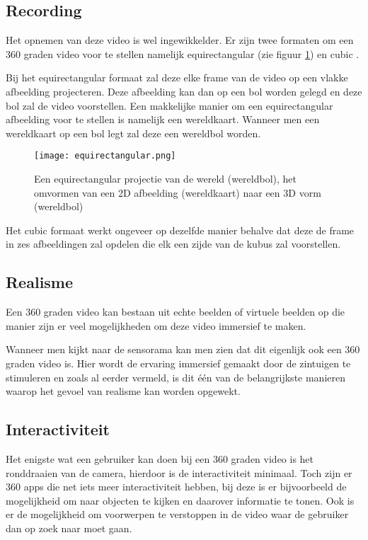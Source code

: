\subsection{Recording}
Het opnemen van deze video is wel ingewikkelder. Er zijn twee formaten om een 360 graden video voor te stellen namelijk equirectangular (zie figuur \ref{fig:equirectangularprojection}) en cubic \autocite{Lee2010}. 

Bij het equirectangular formaat zal deze elke frame van de video op een vlakke afbeelding projecteren. Deze afbeelding kan dan op een bol worden gelegd en deze bol zal de video voorstellen. Een makkelijke manier om een equirectangular afbeelding voor te stellen is namelijk een wereldkaart. Wanneer men een wereldkaart op een bol legt zal deze een wereldbol worden.
 
\begin{figure}
    \texttt{[image: equirectangular.png]}
    \caption{Een equirectangular projectie van de wereld (wereldbol), het omvormen van een 2D afbeelding (wereldkaart) naar een 3D vorm (wereldbol) \autocite{Brown2017}}
    \label{fig:equirectangularprojection}
\end{figure}

Het cubic formaat werkt ongeveer op dezelfde manier behalve dat deze de frame in zes afbeeldingen zal opdelen die elk een zijde van de kubus zal voorstellen.

\subsection{Realisme}
Een 360 graden video kan bestaan uit echte beelden of virtuele beelden op die manier zijn er veel mogelijkheden om deze video immersief te maken. 

Wanneer men kijkt naar de sensorama kan men zien dat dit eigenlijk ook een 360 graden video is. Hier wordt de ervaring immersief gemaakt door de zintuigen te stimuleren en zoals al eerder vermeld, is dit één van de belangrijkste manieren waarop het gevoel van realisme kan worden opgewekt.

\subsection{Interactiviteit}
Het enigste wat een gebruiker kan doen bij een 360 graden video is het ronddraaien van de camera, hierdoor is de interactiviteit minimaal. Toch zijn er 360 apps die net iets meer interactiviteit hebben, bij deze is er bijvoorbeeld de mogelijkheid om naar objecten te kijken en daarover informatie te tonen. Ook is er de mogelijkheid om voorwerpen te verstoppen in de video waar de gebruiker dan op zoek naar moet gaan.
